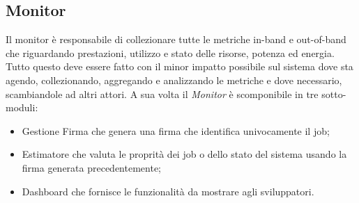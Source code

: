 \subsection{Monitor}

Il monitor è responsabile di collezionare tutte le metriche in-band e out-of-band che riguardando prestazioni, utilizzo e stato delle risorse, potenza ed energia.
Tutto questo deve essere fatto con il minor impatto possibile sul sistema dove sta agendo, collezionando, aggregando e analizzando le metriche e dove necessario, scambiandole ad altri attori. A sua volta il \emph{Monitor} è scomponibile in tre sotto-moduli:
\begin{itemize}
    \item Gestione Firma che genera una firma che identifica univocamente il job; 
    \item Estimatore che valuta le proprità dei job o dello stato del sistema usando la firma generata precedentemente;
    \item Dashboard che fornisce le funzionalità da mostrare agli sviluppatori.
\end{itemize}


